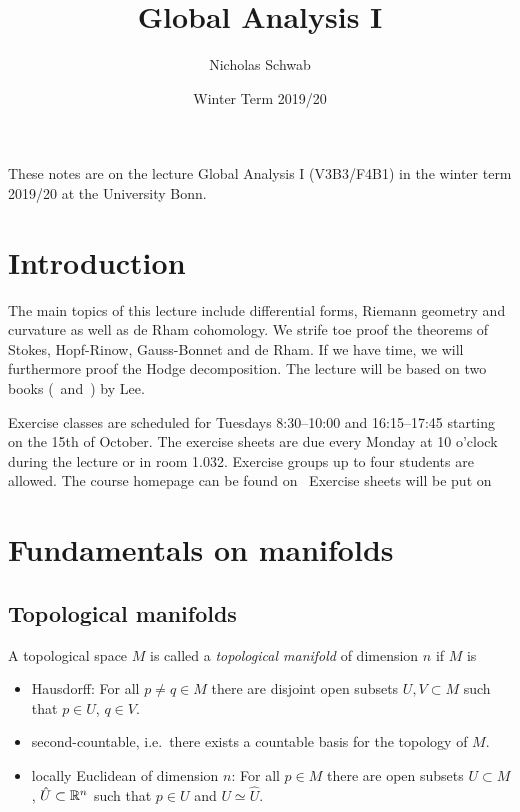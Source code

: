 \documentclass{skript}
\title{Global Analysis I}
\author{Nicholas Schwab}
\date{Winter Term 2019/20}
\begin{document}
\thispagestyle{plain}
These notes are on the lecture Global Analysis I (V3B3/F4B1) in the winter term 2019/20 at the University Bonn.

\tableofcontents

\chapter{Introduction}
The main topics of this lecture include differential forms, Riemann geometry and curvature as well as de Rham cohomology. 
We strife toe proof the theorems of Stokes, Hopf-Rinow, Gauss-Bonnet and de Rham.
If we have time, we will furthermore proof the Hodge decomposition. 
The lecture will be based on two books (\cite{lee_smooth}~and~\cite{lee_riemannian}) by Lee.

Exercise classes are scheduled for Tuesdays 8:30--10:00 and 16:15--17:45 starting on the 15th of October. 
The exercise sheets are due every Monday at 10 o'clock during the lecture or in room 1.032.
Exercise groups up to four students are allowed.
The course homepage can be found on~\cite{prof_webpage}
Exercise sheets will be put on~\cite{lecture_webpage}

\chapter{Fundamentals on manifolds}
\section{Topological manifolds}

\begin{definition}\label{def:topmanf}
    A topological space $M$ is called a \emph{topological manifold} of dimension $n$ if $M$ is
    \begin{itemize}
        \item
            Hausdorff: For all $p\neq q\in M$ there are disjoint open subsets  $U,V\subset M$ such that $p\in U$, $q\in V$.
        \item 
            second-countable, i.e.\ there exists a countable basis for the topology of $M$.
        \item
            locally Euclidean of dimension $n$: For all $p\in M$ there are open subsets $U\subset M$, $\hat U\subset \mathbb{R}^n$ such that $p\in U$ and $U\simeq \hat U$.
    \end{itemize}
\end{definition}
\end{document}
